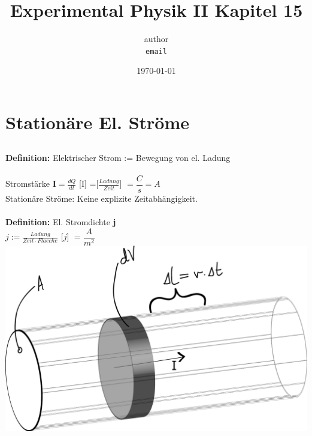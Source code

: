 \documentclass[11pt]{article}
\begin{document}
	\title{Experimental Physik II Kapitel 15}
		\author
		{
			author\\
			{\small 	\texttt{email}}
		}
		\date{\today}
	\maketitle
	\tableofcontents
	\setcounter{section}{14} %
	
	\newpage
	
\section{Stationäre El. Ströme }
	\subsection{}
		\textbf{Definition:} \hspace{1cm} Elektrischer Strom := Bewegung von el. Ladung \\
		\\
		Stromst\"{a}rke $\textbf{I} = \frac{dQ}{dt}$ [I] =[$\frac{Ladung}{Zeit}$] $=\dfrac{C}{s} = A$ \\
		Stationäre Ströme: Keine explizite Zeitabhängigkeit.\\ 
		\\
		\textbf{Definition:} \hspace{1cm} El. Stromdichte \textbf{j} \\
		$j:=\frac{Ladung}{Zeit\cdot Flaeche} $ [$j$] $=\dfrac{A}{m^2}$ \\
		\includegraphics[width=0.6\linewidth]{skizzen/15/VL06/15_1}
		\\
		
\end{document}
